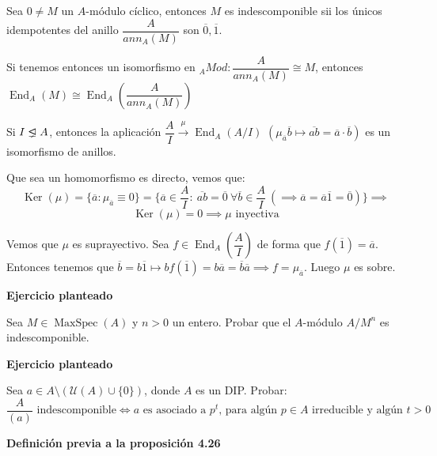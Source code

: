 \documentclass[openany]{book}
\begin{document}
\begin{lemma}
    Sea $ 0 \ne M$ un $ A$-módulo cíclico, entonces $ M$ es indescomponible sii los únicos idempotentes del anillo $ \dfrac{A}{an n_{A}(M)}$ son $ \overline{0},\overline{1}$.

    Si tenemos entonces un isomorfismo en $ _{A}Mod: \dfrac{A}{an n_{A}(M)}\cong M$, entonces $ \operatorname{End}_{A}(M) \cong \operatorname{End}_{A} \left( \dfrac{A}{an n_{A}(M)} \right)$

\end{lemma}


\begin{exercise}
    Si $ I \properideal A$, entonces la aplicación $ \dfrac{A}{I} \xrightarrow{\mu} \operatorname{End}_{A}(A/I)$ $ (\mu_{\overline{a}}\overline{b} \mapsto \overline{ab} = \overline{a}\cdot \overline{b})$ es un isomorfismo de anillos.

    Que sea un homomorfismo es directo, vemos que:
    $$ \operatorname{Ker}(\mu) = \{\overline{a}: \mu_{\overline{a}} \equiv 0\} = \{\overline{a} \in \dfrac{A}{I}:\ \overline{ab} = \overline{0}\ \forall \overline{b} \in \dfrac{A}{I}\ (\implies \overline{a} = \overline{a}\overline{1} = \overline{0})\} \implies $$
    $$ \operatorname{Ker}(\mu) = 0 \implies \mu \text{ inyectiva} $$

    Vemos que $ \mu$ es suprayectivo. Sea $ f \in \operatorname{End}_{A}\left(\dfrac{A}{I}\right)$ de forma que $ f(\overline{1}) = \overline{a}$. Entonces tenemos que $ \overline{b} = b \overline{1} \mapsto bf(\overline{1}) = b \overline{a} = \overline{b} \overline{a} \implies f = \mu_{\overline{a}}$. Luego $ \mu$ es sobre.
\end{exercise}


\begin{exercise}
    \textbf{Ejercicio planteado}    

    Sea $ M \in \operatorname{MaxSpec}(A)$ y $ n>0$ un entero. Probar que el $ A$-módulo $ A/M^{n}$ es indescomponible.
\end{exercise}

\begin{exercise}
    \textbf{Ejercicio planteado}

    Sea $ a \in A \setminus (\mathcal{U}(A) \cup \{0\})$, donde $ A$ es un DIP. Probar:
    $$ \dfrac{A}{(a)} \text{ indescomponible} \iff a\text{  es asociado a }p^{t}\text{, para algún }p \in A \text{ irreducible y algún } t>0 $$
\end{exercise}

\noindent \textbf{Definición previa a la proposición 4.26}
\end{document}
